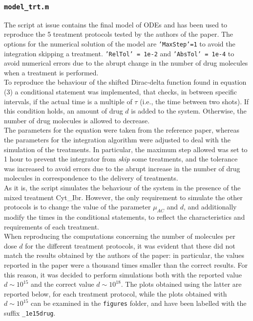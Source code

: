 \subsubsection{\texttt{model\_trt.m}}
The script at issue contains the final model of ODEs and has been used to reproduce the 5 treatment protocols tested by the authors of the paper. The options for the numerical solution of the model are \texttt{'MaxStep'=1} to avoid the integration skipping a treatment. \texttt{'RelTol' = 1e-2} and \texttt{'AbsTol' = 1e-4} to avoid numerical errors due to the abrupt change in the number of drug molecules when a treatment is performed.\\
To reproduce the behaviour of the shifted Dirac-delta function found in equation (3) a conditional statement was implemented, that checks, in between specific intervals, if the actual time is a multiple of $\tau$ (i.e., the time between two shots). If this condition holds, an amount of drug $d$ is added to the system. Otherwise, the number of drug molecules is allowed to decrease.\\
The parameters for the equation were taken from the reference paper, whereas the parameters for the integration algorithm were adjusted to deal with the simulation of the treatments. In particular, the maximum step allowed was set to 1 hour to prevent the integrator from \textit{skip} some treatments, and the tolerance was increased to avoid errors due to the abrupt increase in the number of drug molecules in correspondence to the delivery of treatments.\\
As it is, the script simulates the behaviour of the system in the presence of the mixed treatment Cyt\_Ibr. However, the only requirement to simulate the other protocols is to change the value of the parameter $\mu_{AC}$ and $d$, and additionally modify the times in the conditional statements, to reflect the characteristics and requirements of each treatment. \\
When reproducing the computations concerning the number of molecules per dose $d$ for the different treatment protocols, it was evident that these did not match the results obtained by the authors of the paper: in particular, the values reported in the paper were a thousand times smaller than the correct results. For this reason, it was decided to perform simulations both with the reported value $d \sim 10^{15}$ and the correct value $d \sim 10^{18}$. The plots obtained using the latter are reported below, for each treatment protocol, while the plots obtained with $d \sim 10^{15}$ can be examined in the \texttt{figures} folder, and have been labelled with the suffix \texttt{\_1e15drug}. \\
